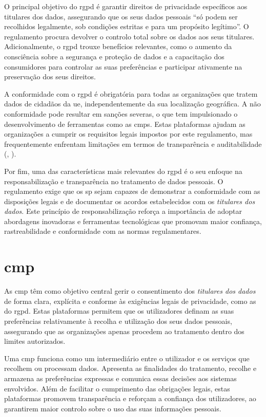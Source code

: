 O principal objetivo do \acrshort{rgpd} é garantir direitos de privacidade específicos aos titulares dos dados, assegurando que os seus dados pessoais “só podem ser recolhidos legalmente, sob condições estritas e para um propósito legítimo”. O regulamento procura devolver o controlo total sobre os dados aos seus titulares. Adicionalmente, o \acrshort{rgpd} trouxe benefícios relevantes, como o aumento da consciência sobre a segurança e proteção de dados e a capacitação dos consumidores para controlar as suas preferências e participar ativamente na preservação dos seus direitos.

A conformidade com o \acrshort{rgpd} é obrigatória para todas as organizações que tratem dados de cidadãos da \acrshort{ue}, independentemente da sua localização geográfica. A não conformidade pode resultar em sanções severas, o que tem impulsionado o desenvolvimento de ferramentas como as \acrshort{cmp}s. Estas plataformas ajudam as organizações a cumprir os requisitos legais impostos por este regulamento, mas frequentemente enfrentam limitações em termos de transparência e auditabilidade (\cite{ribeiro2025assessing}, \cite{ramos2019privacy}).

Por fim, uma das características mais relevantes do \acrshort{rgpd} é o seu enfoque na responsabilização e transparência no tratamento de dados pessoais. O regulamento exige que os \acrfull{sp} sejam capazes de demonstrar a conformidade com as disposições legais e de documentar os acordos estabelecidos com os \textit{titulares dos dados}. Este princípio de responsabilização reforça a importância de adoptar abordagens inovadoras e ferramentas tecnológicas que promovam maior confiança, rastreabilidade e conformidade com as normas regulamentares.

\newpage

\section{\texorpdfstring{\acrfull{cmp}}{CMP}}

As \acrfull{cmp} têm como objetivo central gerir o consentimento dos \textit{titulares dos dados} de forma clara, explícita e conforme às exigências legais de privacidade, como as do \acrshort{rgpd}. Estas plataformas permitem que os utilizadores definam as suas preferências relativamente à recolha e utilização dos seus dados pessoais, assegurando que as organizações apenas procedem ao tratamento dentro dos limites autorizados. 

Uma \acrshort{cmp} funciona como um intermediário entre o utilizador e os serviços que recolhem ou processam dados. Apresenta as finalidades do tratamento, recolhe e armazena as preferências expressas e comunica essas decisões aos sistemas envolvidos. Além de facilitar o cumprimento das obrigações legais, estas plataformas promovem transparência e reforçam a confiança dos utilizadores, ao garantirem maior controlo sobre o uso das suas informações pessoais.

